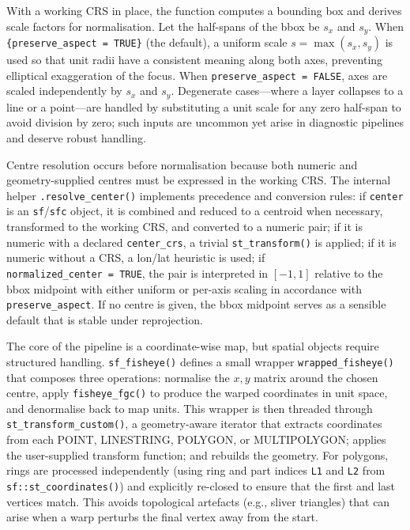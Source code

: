 With a working CRS in place, the function computes a bounding box and derives scale factors for
normalisation. Let the half-spans of the bbox be \(s_x\) and \(s_y\). When \texttt{\{preserve\_aspect\ =\ TRUE\}} (the default), a uniform scale \(s = \max(s_x, s_y)\) is used so that unit radii have a
consistent meaning along both axes, preventing elliptical exaggeration of the focus. When
\texttt{preserve\_aspect\ =\ FALSE}, axes are scaled independently by \(s_x\) and \(s_y\). Degenerate
cases---where a layer collapses to a line or a point---are handled by substituting a unit scale for any
zero half-span to avoid division by zero; such inputs are uncommon yet arise in diagnostic pipelines
and deserve robust handling.

Centre resolution occurs before normalisation because both numeric and geometry-supplied centres must
be expressed in the working CRS. The internal helper \texttt{.resolve\_center()} implements precedence
and conversion rules: if \texttt{center} is an \texttt{sf}/\texttt{sfc} object, it is combined and reduced
to a centroid when necessary, transformed to the working CRS, and converted to a numeric pair; if it
is numeric with a declared \texttt{center\_crs}, a trivial \texttt{st\_transform()} is applied; if it is
numeric without a CRS, a lon/lat heuristic is used; if \texttt{normalized\_center\ =\ TRUE}, the pair is
interpreted in \([-1, 1]\) relative to the bbox midpoint with either uniform or per-axis scaling in
accordance with \texttt{preserve\_aspect}. If no centre is given, the bbox midpoint serves as a sensible
default that is stable under reprojection.

The core of the pipeline is a coordinate-wise map, but spatial objects require structured handling.
\texttt{sf\_fisheye()} defines a small wrapper \texttt{wrapped\_fisheye()} that composes three operations:
normalise the \(x,y\) matrix around the chosen centre, apply \texttt{fisheye\_fgc()} to produce the
warped coordinates in unit space, and denormalise back to map units. This wrapper is then threaded
through \texttt{st\_transform\_custom()}, a geometry-aware iterator that extracts coordinates from each
POINT, LINESTRING, POLYGON, or MULTIPOLYGON; applies the user-supplied transform function; and
rebuilds the geometry. For polygons, rings are processed independently (using ring and part indices
\texttt{L1} and \texttt{L2} from \texttt{sf::st\_coordinates()}) and explicitly re-closed to ensure that the
first and last vertices match. This avoids topological artefacts (e.g., sliver triangles) that can
arise when a warp perturbs the final vertex away from the start.

